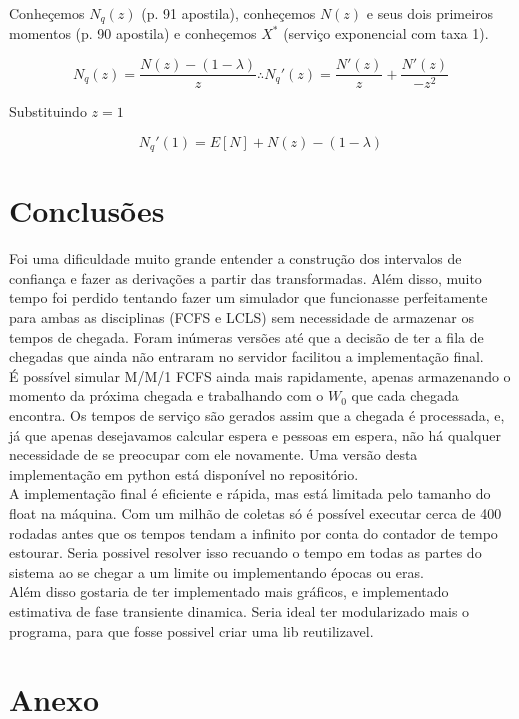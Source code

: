 \documentclass{article}
\begin{document}
Conheçemos $N_q(z)$ (p. 91 apostila), conheçemos $N(z)$ e seus dois primeiros momentos (p. 90 apostila) e conheçemos $X^*$ (serviço exponencial com taxa 1). 

\[ N_q(z) = \frac{ N(z) - ( 1 - \lambda ) }{ z } \therefore N_q' (z) = \frac{N'(z)}{z} + \frac{N'(z)}{-z^2}\]

Substituindo $z=1$

\[ N_q' (1) = E[N] + N(z) - (1-\lambda)\]


\section{Conclusões}
Foi uma dificuldade muito grande entender a construção dos intervalos de confiança e fazer as derivações a partir das transformadas. Além disso, muito tempo foi perdido tentando fazer um simulador que funcionasse perfeitamente para ambas as disciplinas (FCFS e LCLS) sem necessidade de armazenar os tempos de chegada. Foram inúmeras versões até que a decisão de ter a fila de chegadas que ainda não entraram no servidor facilitou a implementação final. \\

É possível simular M/M/1 FCFS ainda mais rapidamente, apenas armazenando o momento da próxima chegada e trabalhando com o $W_0$ que cada chegada encontra. Os tempos de serviço são gerados assim que a chegada é processada, e, já que apenas desejavamos calcular espera e pessoas em espera, não há qualquer necessidade de se preocupar com ele novamente. Uma versão desta implementação em python está disponível no repositório. \\

A implementação final é eficiente e rápida, mas está limitada pelo tamanho do float na máquina. Com um milhão de coletas só é possível executar cerca de 400 rodadas antes que os tempos tendam a infinito por conta do contador de tempo estourar. Seria possivel resolver isso recuando o tempo em todas as partes do sistema ao se chegar a um limite ou implementando épocas ou eras. \\

Além disso gostaria de ter implementado mais gráficos, e implementado estimativa de fase transiente dinamica. Seria ideal ter modularizado mais o programa, para que fosse possivel criar uma lib reutilizavel.

\section{Anexo}
\end{document}
